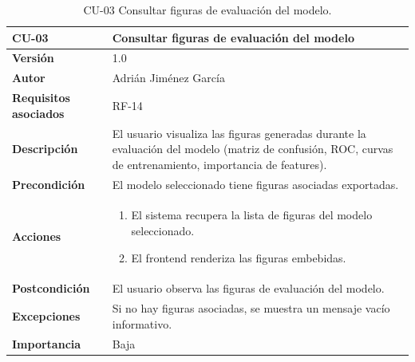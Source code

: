 \begin{table}[p]
	\centering
	\begin{tabularx}{\linewidth}{ p{} X }
		\toprule
		\textbf{CU-03}    & \textbf{Consultar figuras de evaluación del modelo}\\
		\toprule
		\textbf{Versión}              & 1.0 \\
		\textbf{Autor}                & Adrián Jiménez García \\
		\textbf{Requisitos asociados} & RF-14 \\
		\textbf{Descripción}          & El usuario visualiza las figuras generadas durante la evaluación del modelo (matriz de confusión, ROC, curvas de entrenamiento, importancia de features). \\
		\textbf{Precondición}         & El modelo seleccionado tiene figuras asociadas exportadas. \\
		\textbf{Acciones}             &
		\begin{enumerate}
			\def\labelenumi{\arabic{enumi}.}
			\tightlist
			\item El sistema recupera la lista de figuras del modelo seleccionado.
			\item El frontend renderiza las figuras embebidas.
		\end{enumerate}\\
		\textbf{Postcondición}        & El usuario observa las figuras de evaluación del modelo. \\
		\textbf{Excepciones}          & Si no hay figuras asociadas, se muestra un mensaje vacío informativo. \\
		\textbf{Importancia}          & Baja \\
		\bottomrule
	\end{tabularx}
	\caption{CU-03 Consultar figuras de evaluación del modelo.}
\end{table}

